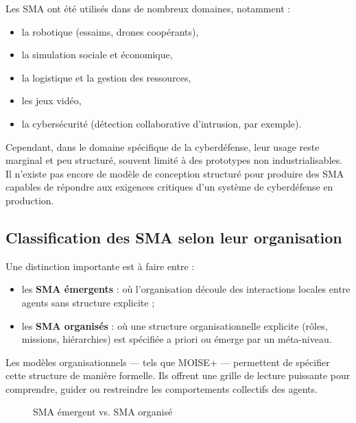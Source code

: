 \documentclass[ twoside,openright,titlepage,numbers=noenddot,headinclude,%
                footinclude=true,cleardoublepage=empty,abstractoff, %
                BCOR=5mm,paper=a4,fontsize=11pt,%
                french,american,%
                ]{scrreprt}
\begin{document}
Les SMA ont été utilisés dans de nombreux domaines, notamment :
\begin{itemize}
    \item la robotique (essaims, drones coopérants),
    \item la simulation sociale et économique,
    \item la logistique et la gestion des ressources,
    \item les jeux vidéo,
    \item la cybersécurité (détection collaborative d’intrusion, par exemple).
\end{itemize}

Cependant, dans le domaine spécifique de la cyberdéfense, leur usage reste marginal et peu structuré, souvent limité à des prototypes non industrialisables. Il n’existe pas encore de modèle de conception structuré pour produire des SMA capables de répondre aux exigences critiques d’un système de cyberdéfense en production.

\vspace{0.5em}
\subsection*{Classification des SMA selon leur organisation}

Une distinction importante est à faire entre :
\begin{itemize}
    \item les \textbf{SMA émergents} : où l’organisation découle des interactions locales entre agents sans structure explicite ;
    \item les \textbf{SMA organisés} : où une structure organisationnelle explicite (rôles, missions, hiérarchies) est spécifiée a priori ou émerge par un méta-niveau.
\end{itemize}

Les modèles organisationnels — tels que MOISE+ — permettent de spécifier cette structure de manière formelle. Ils offrent une grille de lecture puissante pour comprendre, guider ou restreindre les comportements collectifs des agents.

\begin{figure}[H]
    \centering
    \caption{SMA émergent vs. SMA organisé}
    \label{fig:sma-comparatif}
\end{figure}
\end{document}
